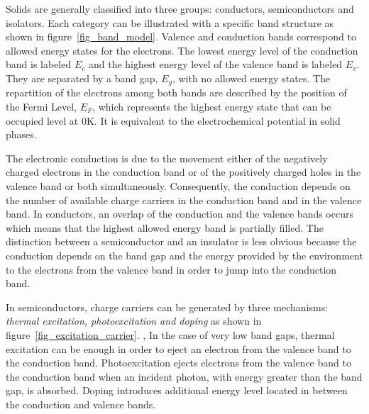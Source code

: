     Solids are generally classified into three groups: 
    conductors, semiconductors and isolators. 
    Each category can be illustrated with a specific band structure as shown in 
    figure~\ref{fig_band_model}. 
    Valence and conduction bands correspond to allowed energy states for the electrons. 
    The lowest energy level of the conduction band is labeled $E_c$ and the 
    highest energy level of the valence band is labeled $E_v$. 
    They are separated by a band gap, $E_g$, with no allowed energy states. 
    The repartition of the electrons among both bands are described by the position 
    of the Fermi Level, $E_F$, which represents the highest energy state that 
    can be occupied level at 0K. 
    It is equivalent to the electrochemical potential in solid phases.

    

    The electronic conduction is due to the movement either of the negatively 
    charged electrons in the conduction band or of the positively charged holes 
    in the valence band or both simultaneously. 
    Consequently, the conduction depends on the number of available charge carriers
    in the conduction band and in the valence band. 
    In conductors, an overlap of the conduction and the valence bands occurs 
    which means that the highest allowed energy band is partially filled. 
    The distinction between a semiconductor and an insulator is less obvious 
    because the conduction depends on the band gap and the energy provided by 
    the environment to the electrons from the valence band in order to jump 
    into the conduction band.

    In semiconductors, charge carriers can be generated by three mechanisms: 
    \emph{thermal excitation, photoexcitation and doping} as shown in 
    figure~\ref{fig_excitation_carrier}.  , 
    In the case of very low band gaps, thermal excitation can be enough in order 
    to eject an electron from the valence band to the conduction band. 
    Photoexcitation ejects electrons from the valence band to the conduction 
    band when an incident photon, with energy greater than the band gap, is absorbed. 
    Doping introduces additional energy level located in between the conduction and 
    valence bands.

